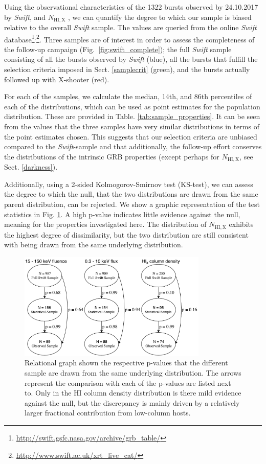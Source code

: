 \documentclass{aa}    %
\begin{document}
Using the observational characteristics of the 1322 bursts observed by
24.10.2017 by \textit{Swift}, and $N_{\mathrm{HI,X}}$ \citep{Evans2009}, we can
quantify the degree to which our sample is biased relative to the overall
\textit{Swift} sample. The values are queried from the online \textit{Swift}
database\footnote{\url{http://swift.gsfc.nasa.gov/archive/grb\_table/}}$^,$\footnote{\url{http://www.swift.ac.uk/xrt\_live\_cat/}}. Three samples are of interest in order to assess the completeness of the follow-up campaign (Fig.~\ref{fig:swift_complete}); the full \textit{Swift} sample consisting of all the bursts observed by \textit{Swift} (blue), all the bursts that fulfill the selection criteria imposed in Sect. \ref{samplecrit} (green), and the bursts actually followed up with X-shooter (red).



For each of the samples, we calculate the median, 14th, and 86th percentiles of
each of the distributions, which can be used as point estimates for the
population distribution. These are provided in Table.
\ref{tab:sample_properties}. It can be seen from the values that the three
samples have very similar distributions in terms of the point estimates chosen.
This suggests that our selection criteria are unbiased compared to the
\textit{Swift}-sample and that additionally, the follow-up effort conserves the
distributions of the intrinsic GRB properties (except perhaps for $N_{\mathrm{HI,X}}$, see Sect. \ref{darkness}). 

Additionally, using a 2-sided Kolmogorov-Smirnov test (KS-test), we can assess
the degree to which the null, that the two distributions are drawn from the same
parent distribution, can be rejected. We show a graphic representation of the
test statistics in Fig. \ref{fig:p_values}. A high p-value indicates little
evidence against the null, meaning for the properties investigated here. The
distribution of $N_{\mathrm{HI,X}}$ exhibits the highest degree of
dissimilarity, but the two distribution are still consistent with being drawn
from the same underlying distribution.

\begin{figure}
	\centerline{\includegraphics[width=9cm]{figures/XSGRB_p_values.pdf}}
	\caption{Relational graph shown the respective p-values that the different
	sample are drawn from the same underlying distribution. The arrows represent
	the comparison with each of the p-values are listed next to. Only in the HI
	column density distribution is there mild evidence against the null, but the
	discrepancy is mainly driven by a relatively larger fractional contribution
	from low-column hosts.}
	\label{fig:p_values}
\end{figure}
\end{document}

